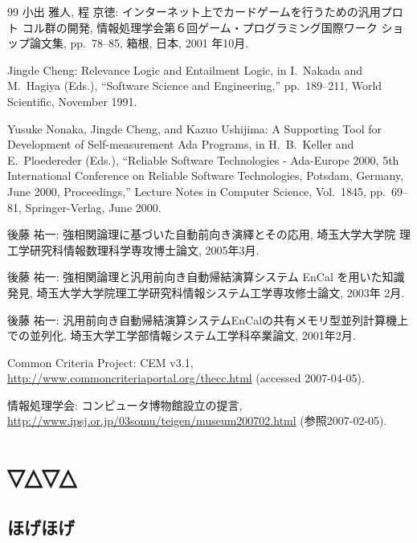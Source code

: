 \documentclass[12pt,dvipdfmx]{jreport}
\begin{document}
\begin{thebibliography}{99}
小出 雅人, 程 京徳: インターネット上でカードゲームを行うための汎用プロト
        コル群の開発, 情報処理学会第６回ゲーム・プログラミング国際ワーク
        ショップ論文集, pp.\ 78--85, 箱根, 日本, 2001 年10月.

Jingde Cheng: Relevance Logic and Entailment Logic, in I.\ Nakada and
        M.\ Hagiya (Eds.), ``Software Science and Engineering,''
        pp.\ 189--211, World Scientific, November 1991.

Yusuke Nonaka, Jingde Cheng, and Kazuo Ushijima: A Supporting Tool for
        Development of Self-measurement Ada Programs, in H.\ B.\ Keller
        and E.\ Ploedereder (Eds.), ``Reliable Software Technologies -
        Ada-Europe 2000, 5th International Conference on Reliable
        Software Technologies, Potsdam, Germany, June 2000,
        Proceedings,'' Lecture Notes in Computer Science, Vol.\ 1845,
        pp.\ 69--81, Springer-Verlag, June 2000.


後藤 祐一: 強相関論理に基づいた自動前向き演繹とその応用, 埼玉大学大学院
	理工学研究科情報数理科学専攻博士論文, 2005年3月.

後藤 祐一: 強相関論理と汎用前向き自動帰結演算システム EnCal を用いた知識
	発見, 埼玉大学大学院理工学研究科情報システム工学専攻修士論文, 2003年
	2月.

後藤 祐一: 汎用前向き自動帰結演算システムEnCalの共有メモリ型並列計算機上
	での並列化, 埼玉大学工学部情報システム工学科卒業論文, 2001年2月.


Common Criteria Project: CEM v3.1,
\url{http://www.commoncriteriaportal.org/thecc.html}
(accessed 2007-04-05).

情報処理学会: コンピュータ博物館設立の提言, \url{http://www.ipsj.or.jp/03somu/teigen/museum200702.html} (参照2007-02-05).

\end{thebibliography}

\appendix %
\chapter{▽△▽△}
\section{ほげほげ}
\end{document}
